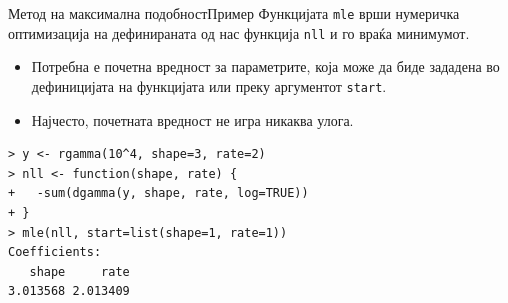 \documentclass[hyperref={unicode}, xcolor={svgnames, table},
usepdftitle=false]{beamer}
\theoremstyle{remark}
\begin{document}
\begin{frame}[fragile]{Метод на максимална подобност}{Пример}
  Функцијата \texttt{mle} врши нумеричка оптимизација на дефинираната од
  нас функција \texttt{nll} и го враќа минимумот.
  \begin{itemize}
  \item Потребна е почетна вредност за параметрите, која може да биде зададена
    во дефиницијата на функцијата или преку аргументот \texttt{start}.
  \item Најчесто, почетната вредност не игра никаква улога.
  \end{itemize}
\begin{verbatim}
> y <- rgamma(10^4, shape=3, rate=2)
> nll <- function(shape, rate) {
+   -sum(dgamma(y, shape, rate, log=TRUE))
+ }
> mle(nll, start=list(shape=1, rate=1))
Coefficients:
   shape     rate
3.013568 2.013409
\end{verbatim}
\end{frame}
\end{document}
